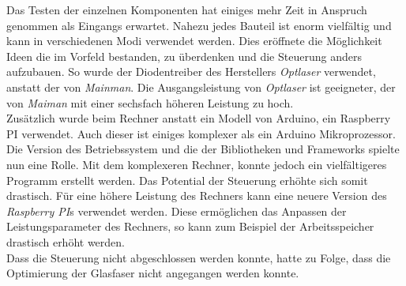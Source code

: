 Das Testen der einzelnen Komponenten hat einiges mehr Zeit in Anspruch genommen als Eingangs erwartet. Nahezu jedes Bauteil ist enorm vielfältig und kann in verschiedenen Modi verwendet werden. Dies eröffnete die Möglichkeit Ideen die im Vorfeld bestanden, zu überdenken und die Steuerung anders aufzubauen. So wurde der Diodentreiber des Herstellers \textit{Optlaser} verwendet, anstatt der von \textit{Mainman}. Die Ausgangsleistung von \textit{Optlaser} ist geeigneter, der von \textit{Maiman} mit einer sechsfach höheren Leistung zu hoch.\\
Zusätzlich wurde beim Rechner anstatt ein Modell von Arduino, ein Raspberry PI verwendet. Auch dieser ist einiges komplexer als ein Arduino Mikroprozessor. Die Version des Betriebssystem und die der Bibliotheken und Frameworks spielte nun eine Rolle. Mit dem komplexeren Rechner, konnte jedoch ein vielfältigeres Programm erstellt werden. Das Potential der Steuerung erhöhte sich somit drastisch.
Für eine höhere Leistung des Rechners kann eine neuere Version des \textit{Raspberry PI}s verwendet werden. Diese ermöglichen das Anpassen der Leistungsparameter des Rechners, so kann zum Beispiel der Arbeitsspeicher drastisch erhöht werden.\\

Dass die Steuerung nicht abgeschlossen werden konnte, hatte zu Folge, dass die Optimierung der Glasfaser nicht angegangen werden konnte.